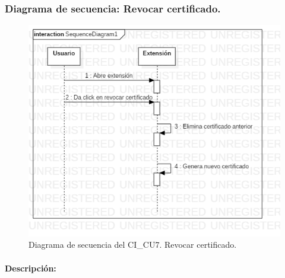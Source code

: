 \documentclass[12pt, a4paper, titlepage]{report}
\begin{document}
    			\subsubsection{Diagrama de secuencia: Revocar certificado.}
        			\begin{figure}[H]
        				\begin{center}    		    	\includegraphics[width=14cm]{./imagenes/Disenio/Componente_1/CI_SD_UC7.png}
        				\caption[Diagrama de secuencia 7 del Componente I]{Diagrama de secuencia del CI\_CU7. Revocar certificado.}
        				\end{center}
        			\end{figure}
        			
        			\paragraph{Descripción:}
        		
    		
\end{document}
